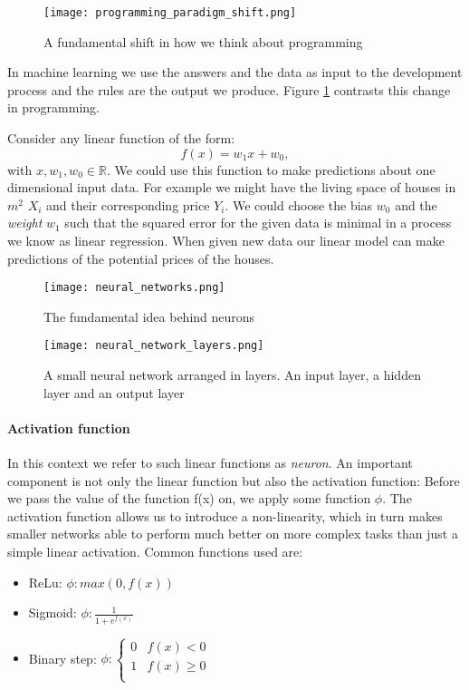 \begin{figure}
    \centering
    \texttt{[image: programming\_paradigm\_shift.png]}
    \caption{A fundamental shift in how we think about programming \cite[p. 5f.]{moroney_ai_2020}}
    \label{programming_paradigm_shift}
\end{figure}

In machine learning we use the answers and the data as input to the development process and the rules are the output we produce. Figure \ref{programming_paradigm_shift} contrasts this change in programming.

Consider any linear function of the form:
$$
    f(x) = w_1x + w_0,
$$
with $ x, w_1, w_0 \in \mathbb{R} $. We could use this function to make predictions about one dimensional input data. For example we might have the living space of houses in $ m^2 $ $ X_i $ and their corresponding price $ Y_i $. We could choose the bias $ w_0 $ and the \textit{weight} $ w_1 $ such that the squared error for the given data is minimal in a process we know as linear regression. When given new data our linear model can make predictions of the potential prices of the houses.


\begin{figure}
    \centering
    \texttt{[image: neural\_networks.png]}
    \caption{The fundamental idea behind neurons}
    \label{neural_network}
\end{figure}

\begin{figure}
    \centering
    \texttt{[image: neural\_network\_layers.png]}
    \caption{A small neural network arranged in layers. An input layer, a hidden layer and an output layer}
    \label{neural_network_layers}
\end{figure}

\paragraph{Activation function}
In this context we refer to such linear functions as \textit{neuron}. An important component is not only the linear function but also the activation function: Before we pass the value of the function f(x) on, we apply some function $ \phi $. The activation function allows us to introduce a non-linearity, which in turn makes smaller networks able to perform much better on more complex tasks than just a simple linear activation. Common functions used are:
\begin{itemize}
    \item ReLu: $ \phi : max(0, f(x)) $
    \item Sigmoid: $ \phi : \frac{1}{1 + e^{f(x)}} $
    \item Binary step: $ \phi : \begin{cases}
                  0 & f(x) < 0    \\
                  1 & f(x) \geq 0 \\
              \end{cases}$
\end{itemize}

